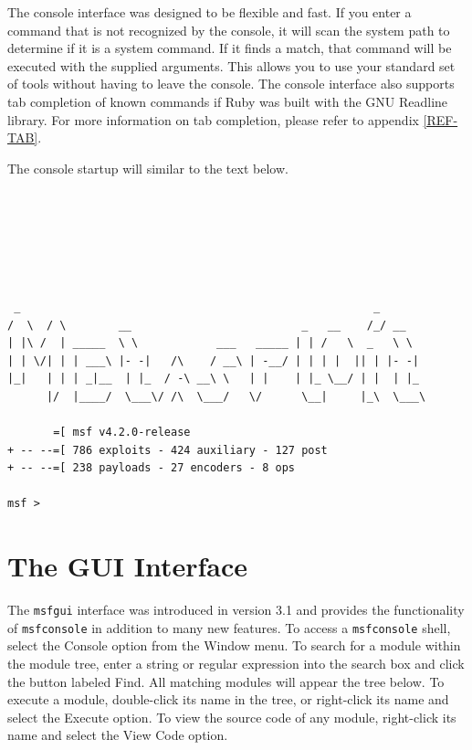 \documentclass{report}
\begin{document}
\par
The console interface was designed to be flexible and fast. If you enter a
command that is not recognized by the console, it will scan the system path to
determine if it is a system command. If it finds a match, that command will be
executed with the supplied arguments. This allows you to use your standard set
of tools without having to leave the console. The console interface also
supports tab completion of known commands if Ruby was built with the GNU
Readline library. For more information on tab completion, please refer to
appendix \ref{REF-TAB}.

\par
The console startup will similar to the text below.

\begin{verbatim}






 _                                                      _
/  \  / \        __                          _   __    /_/ __
| |\ /  | _____  \ \            ___   _____ | | /   \  _   \ \
| | \/| | | ___\ |- -|   /\    / __\ | -__/ | | | |  || | |- -|
|_|   | | | _|__  | |_  / -\ __\ \   | |    | |_ \__/ | |  | |_
      |/  |____/  \___\/ /\  \___/   \/      \__|     |_\  \___\

       =[ msf v4.2.0-release
+ -- --=[ 786 exploits - 424 auxiliary - 127 post
+ -- --=[ 238 payloads - 27 encoders - 8 ops

msf >
\end{verbatim}

    \section{The GUI Interface}
    \label{STARTED-GUI}

\par
The \texttt{msfgui} interface was introduced in version 3.1 and provides the
functionality of \texttt{msfconsole} in addition to many new features. To access
a \texttt{msfconsole} shell, select the Console option from the Window menu. To
search for a module within the module tree, enter a string or regular expression
into the search box and click the button labeled Find. All matching modules will
appear the tree below. To execute a module, double-click its name in the tree,
or right-click its name and select the Execute option. To view the source code
of any module, right-click its name and select the View Code option.
\end{document}
